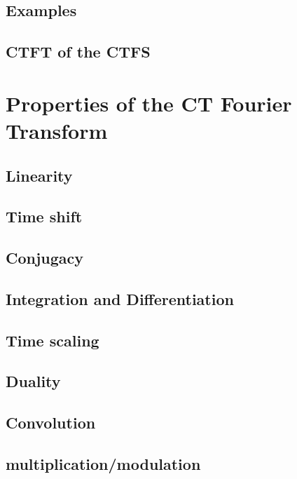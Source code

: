 \documentclass{article}
\begin{document}
\subsection{Examples}
\label{sec:org126acc4}

\subsection{CTFT of the CTFS}
\label{sec:orga61d23b}

\section{Properties of the CT Fourier Transform}
\label{sec:org15bd740}

\subsection{Linearity}
\label{sec:org21f9e2d}

\subsection{Time shift}
\label{sec:orgef4cf09}

\subsection{Conjugacy}
\label{sec:org9c26c6c}

\subsection{Integration and Differentiation}
\label{sec:org8e416a7}

\subsection{Time scaling}
\label{sec:org53b0fa4}

\subsection{Duality}
\label{sec:org4485cab}

\subsection{Convolution}
\label{sec:orgf984e94}

\subsection{multiplication/modulation}
\label{sec:org7b3d857}
\end{document}
